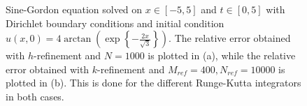 \begin{figure}
\centering
{}\hspace{0mm}
\hspace{0mm}
\caption{Sine-Gordon equation solved on $x \in [-5,5]$ and $t \in [0,5]$ with Dirichlet boundary conditions and initial condition $u(x,0)=4\arctan{\left( \exp{\left\{-\frac{2x}{\sqrt{3}}\right\}} \right)}$. The relative error obtained with $h$-refinement and $N=1000$ is plotted in (a), while the relative error obtained with $k$-refinement and $M_{ref}=400, N_{ref}=10000$ is plotted in (b). This is done for the different Runge-Kutta integrators in both cases.}
\end{figure}

